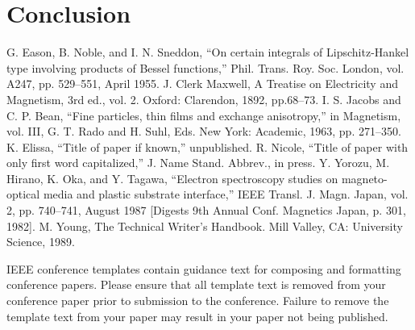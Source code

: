 \documentclass[11pt,conference]{IEEEtran}
\begin{document}
\section{Conclusion}


\begin{thebibliography}{00}
 G. Eason, B. Noble, and I. N. Sneddon, ``On certain integrals of Lipschitz-Hankel type involving products of Bessel functions,'' Phil. Trans. Roy. Soc. London, vol. A247, pp. 529--551, April 1955.
 J. Clerk Maxwell, A Treatise on Electricity and Magnetism, 3rd ed., vol. 2. Oxford: Clarendon, 1892, pp.68--73.
 I. S. Jacobs and C. P. Bean, ``Fine particles, thin films and exchange anisotropy,'' in Magnetism, vol. III, G. T. Rado and H. Suhl, Eds. New York: Academic, 1963, pp. 271--350.
 K. Elissa, ``Title of paper if known,'' unpublished.
 R. Nicole, ``Title of paper with only first word capitalized,'' J. Name Stand. Abbrev., in press.
 Y. Yorozu, M. Hirano, K. Oka, and Y. Tagawa, ``Electron spectroscopy studies on magneto-optical media and plastic substrate interface,'' IEEE Transl. J. Magn. Japan, vol. 2, pp. 740--741, August 1987 [Digests 9th Annual Conf. Magnetics Japan, p. 301, 1982].
 M. Young, The Technical Writer's Handbook. Mill Valley, CA: University Science, 1989.
\end{thebibliography}
\vspace{12pt}
\color{red}
IEEE conference templates contain guidance text for composing and formatting conference papers. Please ensure that all template text is removed from your conference paper prior to submission to the conference. Failure to remove the template text from your paper may result in your paper not being published.
\end{document}

